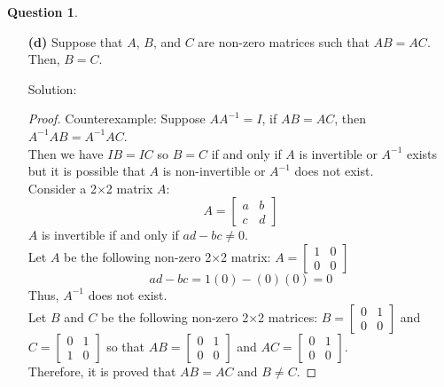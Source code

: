 \documentclass{article}
\theoremstyle{definition}
\newtheorem{question}{Question}
\begin{document}
\begin{question}
\begin{enumerate}
\vspace{.25cm}

\item[{\bf (d)}] Suppose that $A$, $B$, and $C$ are non-zero matrices such that $AB = AC$. Then, $B = C$.

Solution:
\begin{proof}
    Counterexample: Suppose \(AA^{-1}=I\), if \(AB=AC\), then \(A^{-1}AB=A^{-1}AC\). \\
    Then we have \(IB=IC\) so \(B=C\) if and only if \(A\) is invertible or \(A^{-1}\) exists but it is possible that \(A\) is non-invertible or \(A^{-1}\) does not exist. \\
    Consider a 2\(\times\)2 matrix \(A\):
    \[A=\begin{bmatrix}
      a & b \\
      c & d
    \end{bmatrix}\]
    \(A\) is invertible if and only if \(ad-bc\neq0\). \\
    Let \(A\) be the following non-zero 2\(\times\)2 matrix:
    \(A=\begin{bmatrix}
      1 & 0 \\
      0 & 0
    \end{bmatrix}\)
    \[ad-bc=1(0)-(0)(0)=0\]
    Thus, \(A^{-1}\) does not exist. \\
    Let \(B\) and \(C\) be the following non-zero 2\(\times\)2 matrices:
    \(B=\begin{bmatrix}
      0 & 1 \\
      0 & 0
    \end{bmatrix}\) and
    \(C=\begin{bmatrix}
      0 & 1 \\
      1 & 0
    \end{bmatrix}\)
    so that
    \(AB=\begin{bmatrix}
      0 & 1 \\
      0 & 0
    \end{bmatrix}\) and
    \(AC=\begin{bmatrix}
      0 & 1 \\
      0 & 0
    \end{bmatrix}\). \\
    Therefore, it is proved that \(AB=AC\) and \(B\neq C\).
\end{proof}



\end{enumerate}

\end{question}
\end{document}
